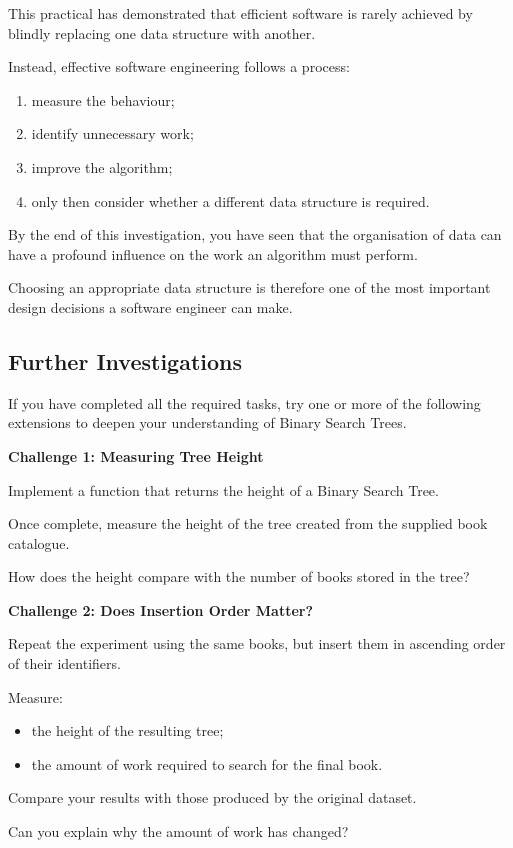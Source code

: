 \documentclass{csc2059practical}
\begin{document}
This practical has demonstrated that efficient software is rarely achieved by
blindly replacing one data structure with another.

Instead, effective software engineering follows a process:

\begin{enumerate}
    \item measure the behaviour;
    \item identify unnecessary work;
    \item improve the algorithm;
    \item only then consider whether a different data structure is required.
\end{enumerate}

By the end of this investigation, you have seen that the organisation of data
can have a profound influence on the work an algorithm must perform.

Choosing an appropriate data structure is therefore one of the most important
design decisions a software engineer can make.


\subsection{Further Investigations}

If you have completed all the required tasks, try one or more of the following
extensions to deepen your understanding of Binary Search Trees.

\begin{challengebox}
\textbf{Challenge 1: Measuring Tree Height}

Implement a function that returns the height of a Binary Search Tree.

Once complete, measure the height of the tree created from the supplied book
catalogue.

How does the height compare with the number of books stored in the tree?
\end{challengebox}

\begin{challengebox}
\textbf{Challenge 2: Does Insertion Order Matter?}

Repeat the experiment using the same books, but insert them in ascending order
of their identifiers.

Measure:

\begin{itemize}
    \item the height of the resulting tree;
    \item the amount of work required to search for the final book.
\end{itemize}

Compare your results with those produced by the original dataset.

Can you explain why the amount of work has changed?
\end{challengebox}
\end{document}
